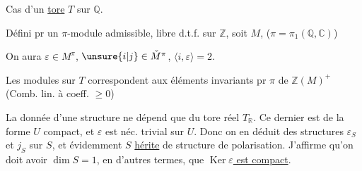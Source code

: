 
Cas d'un \uline{tore} $T$ sur $\mathbb Q$.

Défini pr un $\pi$-module admissible, libre d.t.f. sur $\mathbb Z$, soit $M$, ($\pi=\pi_1(\mathbb Q,\mathbb C)$)

On aura $\varepsilon\in M^\pi$, $\unsure{i|j}\in\check M^\pi$, $\langle i,\varepsilon\rangle=2$.

Les modules sur $T$ correspondent aux éléments invariants pr $\pi$ de $\mathbb Z(M)^+$ (Comb. lin. à coeff. $\geq0$)


La donnée d'une structure   ne dépend que du tore réel $T_{\mathbb R}$. Ce dernier est de la forme   $U$ compact,   et $\varepsilon$ est néc. trivial sur $U$. Donc on en déduit des structures $\varepsilon_S$ et $j_S$ sur $S$, et évidemment $S$ \uline{hérite} de structure de polarisation. J'affirme qu'on doit avoir $\dim S=1$, en d'autres termes, que \uline{$\operatorname{Ker}\varepsilon$ est compact}.


